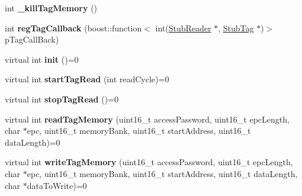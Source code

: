 \begin{DoxyCompactItemize}
\item 
\hypertarget{class_e_l_f_i_n_1_1_abstract_reader_a53e08b085014d4e3c79d1a4078e27c55}{int {\bfseries \-\_\-kill\-Tag\-Memory} ()}\label{class_e_l_f_i_n_1_1_abstract_reader_a53e08b085014d4e3c79d1a4078e27c55}

\item 
\hypertarget{class_e_l_f_i_n_1_1_abstract_reader_a09ef7e8697a076ffdc49d8dbb5d58e93}{int {\bfseries reg\-Tag\-Callback} (boost\-::function$<$ int(\hyperlink{class_e_l_f_i_n_1_1_stub_reader}{Stub\-Reader} $\ast$, \hyperlink{class_e_l_f_i_n_1_1_stub_tag}{Stub\-Tag} $\ast$)$>$ p\-Tag\-Call\-Back)}\label{class_e_l_f_i_n_1_1_abstract_reader_a09ef7e8697a076ffdc49d8dbb5d58e93}

\item 
\hypertarget{class_e_l_f_i_n_1_1_abstract_reader_ae6fc040fd2a28baf7409c9bff1259197}{virtual int {\bfseries init} ()=0}\label{class_e_l_f_i_n_1_1_abstract_reader_ae6fc040fd2a28baf7409c9bff1259197}

\item 
\hypertarget{class_e_l_f_i_n_1_1_abstract_reader_a21fbc506ee7e9b952bc908a85fd54169}{virtual int {\bfseries start\-Tag\-Read} (int read\-Cycle)=0}\label{class_e_l_f_i_n_1_1_abstract_reader_a21fbc506ee7e9b952bc908a85fd54169}

\item 
\hypertarget{class_e_l_f_i_n_1_1_abstract_reader_afa744bda4c0515ad16231ce51f13ee29}{virtual int {\bfseries stop\-Tag\-Read} ()=0}\label{class_e_l_f_i_n_1_1_abstract_reader_afa744bda4c0515ad16231ce51f13ee29}

\item 
\hypertarget{class_e_l_f_i_n_1_1_abstract_reader_a7b78ab281237c7eb70e7d0874c483dac}{virtual int {\bfseries read\-Tag\-Memory} (uint16\-\_\-t access\-Password, uint16\-\_\-t epc\-Length, char $\ast$epc, uint16\-\_\-t memory\-Bank, uint16\-\_\-t start\-Address, uint16\-\_\-t data\-Length)=0}\label{class_e_l_f_i_n_1_1_abstract_reader_a7b78ab281237c7eb70e7d0874c483dac}

\item 
\hypertarget{class_e_l_f_i_n_1_1_abstract_reader_a08385c75c19fef14eb72a94372fb904d}{virtual int {\bfseries write\-Tag\-Memory} (uint16\-\_\-t access\-Password, uint16\-\_\-t epc\-Length, char $\ast$epc, uint16\-\_\-t memory\-Bank, uint16\-\_\-t start\-Address, uint16\-\_\-t data\-Length, char $\ast$data\-To\-Write)=0}\label{class_e_l_f_i_n_1_1_abstract_reader_a08385c75c19fef14eb72a94372fb904d}

\end{DoxyCompactItemize}
